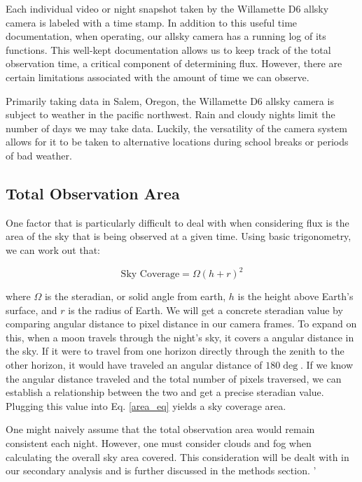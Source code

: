 Each individual video or night snapshot taken by the Willamette D6 allsky camera is labeled with a time stamp.  
In addition to this useful time documentation, when operating, our allsky camera has a running log of its functions.
This well-kept documentation allows us to keep track of the total observation time, a critical component of determining flux.  
However, there are certain limitations associated with the amount of time we can observe.

Primarily taking data in Salem, Oregon, the Willamette D6 allsky camera is subject to weather in the pacific northwest.  
Rain and cloudy nights limit the number of days we may take data.
Luckily, the versatility of the camera system allows for it to be taken to alternative locations during school breaks or periods of bad weather.


\subsection{Total Observation Area}
One factor that is particularly difficult to deal with when considering flux is the area of the sky that is being observed at a given time.
Using basic trigonometry, we can work out that:

\begin{equation}
    \text{Sky Coverage} = \Omega(h+r)^2
    \label{area_eq}
\end{equation}

where $\Omega$ is the steradian, or solid angle from earth, $h$ is the height above Earth's surface, and $r$ is the radius of Earth.
We will get a concrete steradian value by comparing angular distance to pixel distance in our camera frames.
To expand on this, when a moon travels through the night's sky, it covers a angular distance in the sky.  
If it were to travel from one horizon directly through the zenith to the other horizon, it would have traveled an angular distance of $180 \deg$.  
If we know the angular distance traveled and the total number of pixels traversed, we can establish a relationship between the two and get a precise steradian value.
Plugging this value into Eq. \ref{area_eq} yields a sky coverage area.

One might naively assume that the total observation area would remain consistent each night.
However, one must consider clouds and fog when calculating the overall sky area covered.
This consideration will be dealt with in our secondary analysis and is further discussed in the methods section.
'